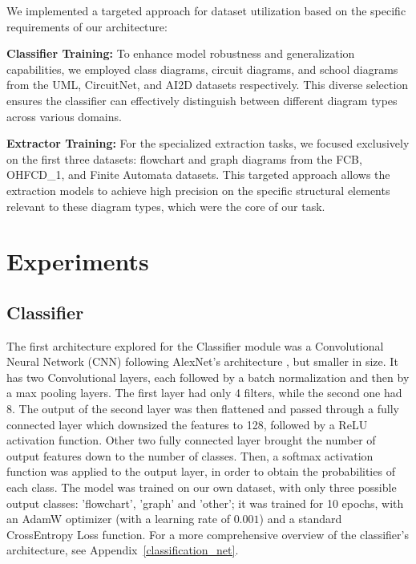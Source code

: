 \documentclass[conference]{IEEEtran}
\begin{document}
We implemented a targeted approach for dataset utilization based on the specific requirements of our architecture:

\textbf{Classifier Training:} To enhance model robustness and generalization capabilities, we employed class diagrams, circuit diagrams, and school diagrams from the UML, CircuitNet, and AI2D datasets respectively. This diverse selection ensures the classifier can effectively distinguish between different diagram types across various domains.

\textbf{Extractor Training:} For the specialized extraction tasks, we focused exclusively on the first three datasets: flowchart and graph diagrams from the FCB, OHFCD\_1, and Finite Automata datasets. This targeted approach allows the extraction models to achieve high precision on the specific structural elements relevant to these diagram types, which were the core of our task. \\

\section{Experiments}

\subsection{Classifier}
\label{exp:classifier}
The first architecture explored for the Classifier module was a Convolutional Neural Network (CNN) following AlexNet's architecture \cite{alexnet}, but smaller in size.
It has two Convolutional layers, each followed by a batch normalization and then by a max pooling layers. The first layer had only 4 filters, while the second one had 8.
The output of the second layer was then flattened and passed through a fully connected layer which downsized the features to 128, followed by a ReLU activation function. Other two fully connected layer brought the number of output features down to the number of classes.
Then, a softmax activation function was applied to the output layer, in order to obtain the probabilities of each class.
The model was trained on our own dataset, with only three possible output classes: 'flowchart', 'graph' and 'other'; it was trained for 10 epochs, with an AdamW optimizer (with a learning rate of $0.001$) and a standard CrossEntropy Loss function. For a more comprehensive overview of the classifier's architecture, see Appendix~\ref{classification_net}.
\\
\end{document}
